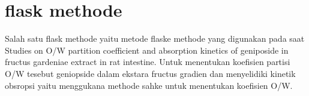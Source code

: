 \section{flask methode}
Salah satu flask methode yaitu metode flaske methode yang digunakan pada saat Studies on O/W partition coefficient and absorption kinetics of geniposide in fructus gardeniae extract in rat intestine. Untuk menentukan koefisien partisi O/W tesebut geniopside dalam ekstara fructus gradien dan menyelidiki kinetik obsropsi yaitu menggukana methode sahke untuk menentukan koefisien O/W.



